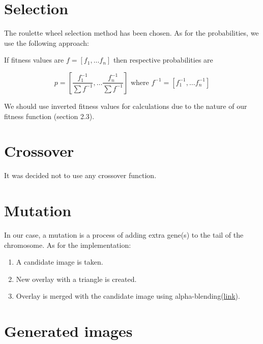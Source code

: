 \documentclass[letterpaper, 16pt]{article}
\newcommand{\vbreak}{\vspace{4mm}}
\begin{document}
\section{Selection}

The roulette wheel selection method has been chosen. As for the probabilities, we use the following approach:

\vbreak

If fitness values are $f = \left[f_1, \dots f_n \right]$ then respective probabilities are 

$$p = \left[\frac{f_1^{-1}}{\sum f^{-1}}, \dots \frac{f_n^{-1}}{\sum f^{-1}} \right] \text{ where } f^{-1} = \left[ f_1^{-1}, \dots f_n^{-1} \right]$$

We should use inverted fitness values for calculations due to the nature of our fitness function (section 2.3).

\section{Crossover}

It was decided not to use any crossover function.

\section{Mutation}

In our case, a mutation is a process of adding extra gene(s) to the tail of the chromosome. As for the implementation: 
\begin{enumerate}
    \item A candidate image is taken.
    \item New overlay with a triangle is created.
    \item Overlay is merged with the candidate image using alpha-blending(\href{https://www.pcmag.com/encyclopedia/term/alpha-blending}{link}).
\end{enumerate}

\newpage
\section{Generated images}
\end{document}
